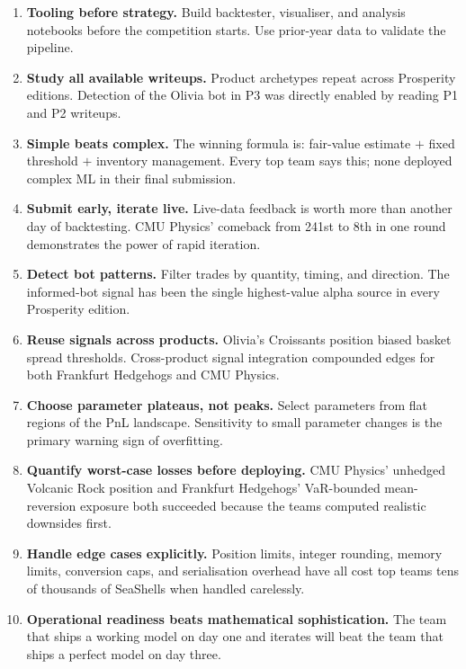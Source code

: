 \begin{enumerate}
  \item \textbf{Tooling before strategy.}  Build backtester,
        visualiser, and analysis notebooks before the competition
        starts.  Use prior-year data to validate the pipeline.

  \item \textbf{Study all available writeups.}  Product archetypes
        repeat across Prosperity editions.  Detection of the
        Olivia bot in P3 was directly enabled by reading P1 and
        P2 writeups.

  \item \textbf{Simple beats complex.}  The winning formula is:
        fair-value estimate $+$ fixed threshold $+$ inventory
        management.  Every top team says this; none deployed
        complex ML in their final submission.

  \item \textbf{Submit early, iterate live.}  Live-data feedback
        is worth more than another day of backtesting.  CMU
        Physics' comeback from 241st to 8th in one round
        demonstrates the power of rapid iteration.

  \item \textbf{Detect bot patterns.}  Filter trades by quantity,
        timing, and direction.  The informed-bot signal has been
        the single highest-value alpha source in every Prosperity
        edition.

  \item \textbf{Reuse signals across products.}  Olivia's
        Croissants position biased basket spread thresholds.
        Cross-product signal integration compounded edges for
        both Frankfurt Hedgehogs and CMU Physics.

  \item \textbf{Choose parameter plateaus, not peaks.}  Select
        parameters from flat regions of the PnL landscape.
        Sensitivity to small parameter changes is the primary
        warning sign of overfitting.

  \item \textbf{Quantify worst-case losses before deploying.}
        CMU Physics' unhedged Volcanic Rock position and Frankfurt
        Hedgehogs' VaR-bounded mean-reversion exposure both
        succeeded because the teams computed realistic downsides
        first.

  \item \textbf{Handle edge cases explicitly.}  Position limits,
        integer rounding, memory limits, conversion caps, and
        serialisation overhead have all cost top teams tens of
        thousands of SeaShells when handled carelessly.

  \item \textbf{Operational readiness beats mathematical
        sophistication.}  The team that ships a working model on
        day one and iterates will beat the team that ships a
        perfect model on day three.
\end{enumerate}
